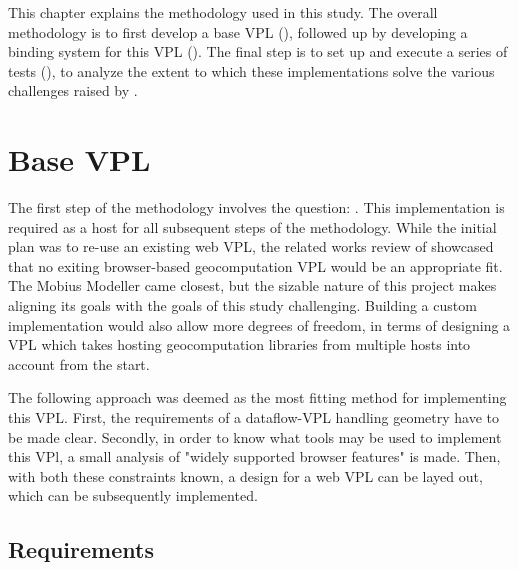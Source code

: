 
This chapter explains the methodology used in this study. 
The overall methodology is to first develop a base VPL (), followed up by developing a binding system for this VPL (). 
The final step is to set up and execute a series of tests (), to analyze the extent to which these implementations solve the various challenges raised by .

\section{Base VPL} 
\label{sec:method:base-vpl}

The first step of the methodology involves the question: \mySubRQOne.
This implementation is required as a host for all subsequent steps of the methodology. 
While the initial plan was to re-use an existing web VPL, the related works review of  showcased that no exiting browser-based geocomputation VPL would be an appropriate fit.
The Mobius Modeller \citep{janssen_mobius_2021} came closest, but the sizable nature of this project makes aligning its goals with the goals of this study challenging. 
Building a custom implementation would also allow more degrees of freedom, in terms of designing a VPL which takes hosting geocomputation libraries from multiple hosts  into account from the start. 

The following approach was deemed as the most fitting method for implementing this VPL. 
First, the requirements of a dataflow-VPL handling geometry have to be made clear.
Secondly, in order to know what tools may be used to implement this VPl, a small analysis of "widely supported browser features" is made. 
Then, with both these constraints known, a design for a web VPL can be layed out, which can be subsequently implemented. 

\subsection{Requirements}

